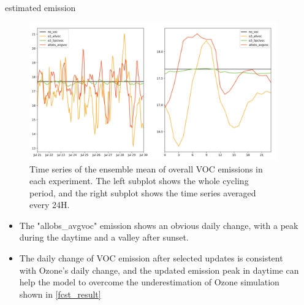 \documentclass[final]{beamer}
\newlength{\sepwidth}
\newlength{\colwidth}
\newcommand{\separatorcolumn}{\begin{column}{\sepwidth}\end{column}}
\begin{document}
\begin{frame}[t]
\begin{columns}[t]
\begin{column}{\colwidth}
			\begin{alertblock}{estimated emission}
                \begin{figure}
                    \centerline{\includegraphics[width=0.8\colwidth,angle=0]{figure/POSTERIOR_emiss_timeseries_24Havg_final.png}}
                    \caption{Time series of the ensemble mean of overall VOC emissions in each experiment. The left subplot shows the whole cycling period, and the right subplot shows the time series averaged every 24H. }\label{fig_emiss_ts}
                \end{figure}
                \begin{itemize}
                    \item The "allobs\_avgvoc" emission shows an obvious daily change, with a peak during the daytime and a valley after sunset.
                    \item The daily change of VOC emission after selected updates is consistent with Ozone's daily change, and the updated emission peak in daytime can help the model to overcome the underestimation of Ozone simulation shown in \cref{fcst_result}
                \end{itemize}

			\end{alertblock}
			
		\end{column}
		
		\separatorcolumn
	\end{columns}
\end{frame}
\end{document}
